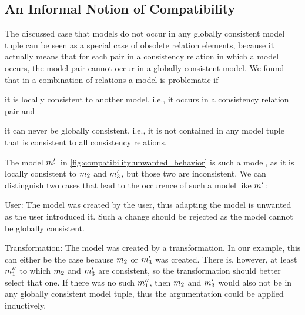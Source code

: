 \subsection{An Informal Notion of Compatibility}

The discussed case that models do not occur in any globally consistent model tuple can be seen as a special case of obsolete relation elements, because it actually means that for each pair in a consistency relation in which a model occurs, the model pair cannot occur in a globally consistent model.
We found that in a combination of relations a model is problematic if
\begin{shortenumerate}
    \item it is locally consistent to another model, i.e., it occurs in a consistency relation pair and
    \item it can never be globally consistent, i.e., it is not contained in any model tuple that is consistent to all consistency relations.
\end{shortenumerate}

The model $\model{m}{1}'$ in \autoref{fig:compatibility:unwanted_behavior} is such a model, as it is locally consistent to $\model{m}{2}$ and $\model{m}{3}'$, but those two are inconsistent.
%
We can distinguish two cases that lead to the occurence of such a model like $\model{m}{1}'$:
\begin{properdescription}
    \item[User:] The model was created by the user, thus adapting the model is unwanted as the user introduced it. Such a change should be rejected as the model cannot be globally consistent.
    \item[Transformation:] The model was created by a transformation. In our example, this can either be the case because $\model{m}{2}$ or $\model{m}{3}'$ was created. There is, however, at least $\model{m}{1}''$ to which $\model{m}{2}$ and $\model{m}{3}'$ are consistent, so the transformation should better select that one. If there was no such $\model{m}{1}''$, then $\model{m}{2}$ and $\model{m}{3}'$ would also not be in any globally consistent model tuple, thus the argumentation could be applied inductively.
\end{properdescription}

